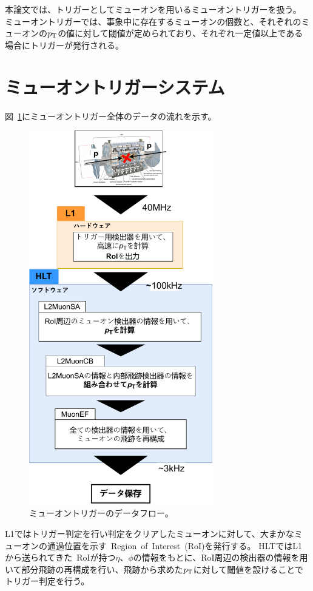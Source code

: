 本論文では、トリガーとしてミューオンを用いるミューオントリガーを扱う。
ミューオントリガーでは、事象中に存在するミューオンの個数と、それぞれのミューオンの$p_\mathrm{T}$の値に対して閾値が定められており、それぞれ一定値以上である場合にトリガーが発行される。


\section{ミューオントリガーシステム}\label{chapter3-2}
図~\ref{fig:muonTrigger}にミューオントリガー全体のデータの流れを示す。

\begin{figure}[H]
  \centering
  \includegraphics[clip, width=8cm]{fig/3/muonTrigger.pdf}
  \caption{ミューオントリガーのデータフロー。}
  \label{fig:muonTrigger}
\end{figure}

L1ではトリガー判定を行い判定をクリアしたミューオンに対して、大まかなミューオンの通過位置を示す~Region~of~Interest~(RoI)を発行する。
HLTではL1から送られてきた~RoIが持つ$\eta$、$\phi$の情報をもとに、RoI周辺の検出器の情報を用いて部分飛跡の再構成を行い、飛跡から求めた$p_\mathrm{T}$に対して閾値を設けることでトリガー判定を行う。

